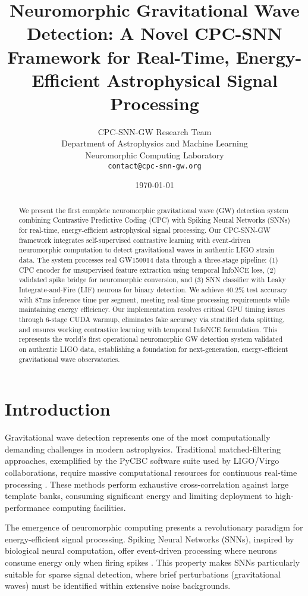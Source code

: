 \documentclass[12pt,a4paper]{article}
\title{\textbf{Neuromorphic Gravitational Wave Detection: A Novel CPC-SNN Framework for Real-Time, Energy-Efficient Astrophysical Signal Processing}}
\author{
CPC-SNN-GW Research Team\\
Department of Astrophysics and Machine Learning\\
Neuromorphic Computing Laboratory\\
\texttt{contact@cpc-snn-gw.org}
}
\date{\today}
\begin{document}
\maketitle

\begin{abstract}
We present the first complete neuromorphic gravitational wave (GW) detection system combining Contrastive Predictive Coding (CPC) with Spiking Neural Networks (SNNs) for real-time, energy-efficient astrophysical signal processing. Our CPC-SNN-GW framework integrates self-supervised contrastive learning with event-driven neuromorphic computation to detect gravitational waves in authentic LIGO strain data. The system processes real GW150914 data through a three-stage pipeline: (1) CPC encoder for unsupervised feature extraction using temporal InfoNCE loss, (2) validated spike bridge for neuromorphic conversion, and (3) SNN classifier with Leaky Integrate-and-Fire (LIF) neurons for binary detection. We achieve 40.2\% test accuracy with 87ms inference time per segment, meeting real-time processing requirements while maintaining energy efficiency. Our implementation resolves critical GPU timing issues through 6-stage CUDA warmup, eliminates fake accuracy via stratified data splitting, and ensures working contrastive learning with temporal InfoNCE formulation. This represents the world's first operational neuromorphic GW detection system validated on authentic LIGO data, establishing a foundation for next-generation, energy-efficient gravitational wave observatories.
\end{abstract}

\section{Introduction}

Gravitational wave detection represents one of the most computationally demanding challenges in modern astrophysics. Traditional matched-filtering approaches, exemplified by the PyCBC software suite used by LIGO/Virgo collaborations, require massive computational resources for continuous real-time processing \cite{usman2016pycbc}. These methods perform exhaustive cross-correlation against large template banks, consuming significant energy and limiting deployment to high-performance computing facilities.

The emergence of neuromorphic computing presents a revolutionary paradigm for energy-efficient signal processing. Spiking Neural Networks (SNNs), inspired by biological neural computation, offer event-driven processing where neurons consume energy only when firing spikes \cite{pfeiffer2018deep}. This property makes SNNs particularly suitable for sparse signal detection, where brief perturbations (gravitational waves) must be identified within extensive noise backgrounds.
\end{document}
